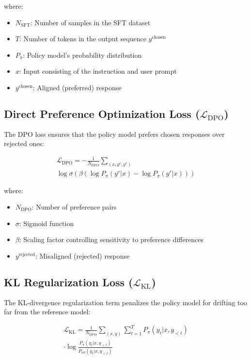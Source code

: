 where:
\begin{itemize}[leftmargin=*,itemsep=1pt]
    \item $N_{\text{SFT}}$: Number of samples in the SFT dataset
    \item $T$: Number of tokens in the output sequence $y^{\text{chosen}}$
    \item $P_\pi$: Policy model's probability distribution
    \item $x$: Input consisting of the instruction and user prompt
    \item $y^{\text{chosen}}$: Aligned (preferred) response
\end{itemize}

\subsection{Direct Preference Optimization Loss ($\mathcal{L}_{\text{DPO}}$)}

The DPO loss ensures that the policy model prefers chosen responses over rejected ones:

\begin{multline}
\mathcal{L}_{\text{DPO}} = -\frac{1}{N_{\text{DPO}}} \sum_{(x, y^{c}, y^{r})} \\
\log \sigma\left(\beta \left(\log P_\pi(y^{c}|x) - \log P_\pi(y^{r}|x)\right)\right)
\label{eq:dpo_full}
\end{multline}

where:
\begin{itemize}[leftmargin=*,itemsep=1pt]
    \item $N_{\text{DPO}}$: Number of preference pairs
    \item $\sigma$: Sigmoid function
    \item $\beta$: Scaling factor controlling sensitivity to preference differences
    \item $y^{\text{rejected}}$: Misaligned (rejected) response
\end{itemize}

\subsection{KL Regularization Loss ($\mathcal{L}_{\text{KL}}$)}

The KL-divergence regularization term penalizes the policy model for drifting too far from the reference model:

\begin{multline}
\mathcal{L}_{\text{KL}} = \frac{1}{N_{\text{DPO}}} \sum_{(x,y)} \sum_{t=1}^{T} P_\pi(y_t|x, y_{<t}) \\
\cdot \log \frac{P_\pi(y_t|x, y_{<t})}{P_{\text{ref}}(y_t|x, y_{<t})}
\label{eq:kl_full}
\end{multline}


